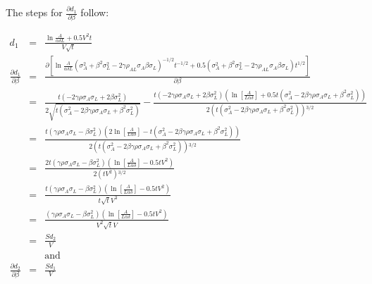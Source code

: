 \documentclass[11pt]{article}
\begin{document}
\newpage
The steps for $\frac{\partial d_1}{\partial \beta}$ follow:

\begin{eqnarray}
d_1&=&\frac{\ln\frac{A}{\alpha \delta L}+0.5 V^2 t}{V\sqrt{t}}\nonumber \\
\frac{\partial d_1}{\partial \beta}&=&\frac{\partial \left[\ln\frac{A}{\alpha \delta L}\left(\sigma_A^2 + \beta^2 \sigma_L^2 -2 \gamma \rho_{AL} \sigma_A \beta \sigma_L\right)^{-1/2} t^{-1/2} + 0.5\left(\sigma_A^2 + \beta^2 \sigma_L^2 -2 \gamma \rho_{AL} \sigma_A \beta \sigma_L\right) t^{1/2}\right]}{\partial \beta} \nonumber\\
&=&\frac{t \left(-2 \gamma  \rho  \sigma _A \sigma _L+2 \beta  \sigma _L^2\right)}{2 \sqrt{t \left(\sigma _A^2-2 \beta  \gamma  \rho  \sigma _A \sigma _L+\beta ^2 \sigma _L^2\right)}}-\frac{t \left(-2 \gamma  \rho  \sigma _A \sigma _L+2 \beta  \sigma _L^2\right) \left(\ln \left[\frac{A}{L \alpha  \delta }\right]+0.5 t \left(\sigma _A^2-2 \beta  \gamma  \rho  \sigma _A \sigma _L+\beta ^2 \sigma _L^2\right)\right)}{2 \left(t \left(\sigma _A^2-2 \beta  \gamma  \rho  \sigma _A \sigma _L+\beta ^2 \sigma _L^2\right)\right){}^{3/2}}\nonumber\\
&=&\frac{t \left(\gamma  \rho  \sigma _A \sigma _L-\beta  \sigma _L^2\right) \left(2 \ln \left[\frac{A}{L \alpha  \delta }\right]-t \left(\sigma _A^2-2 \beta  \gamma  \rho  \sigma _A \sigma _L+\beta ^2 \sigma _L^2\right)\right)}{2 \left(t \left(\sigma _A^2-2 \beta  \gamma  \rho  \sigma _A \sigma _L+\beta ^2 \sigma _L^2\right)\right){}^{3/2}}\nonumber \\
&=&\frac{2t \left(\gamma  \rho  \sigma _A \sigma _L-\beta  \sigma _L^2\right) \left(\ln \left[\frac{A}{L \alpha  \delta }\right]-0.5t V^2\right)}{2 \left(t V^2\right){}^{3/2}}\nonumber \\
&=&\frac{t \left(\gamma  \rho  \sigma _A \sigma _L-\beta  \sigma _L^2\right) \left(\ln \left[\frac{A}{L \alpha  \delta }\right]-0.5t V^2\right)}{t\sqrt{t}V^3}\nonumber \\
&=&\frac{\left(\gamma  \rho  \sigma _A \sigma _L-\beta  \sigma _L^2\right) \left(\ln \left[\frac{A}{L \alpha  \delta }\right]-0.5t V^2\right)}{V^2 \sqrt{t}V}\nonumber \\
&=&\frac{Sd_2}{V}\\
&&\text{and} \nonumber \\
\frac{\partial d_2}{\partial \beta}&=& \frac{Sd_1}{V}
\end{eqnarray}
\end{document}
